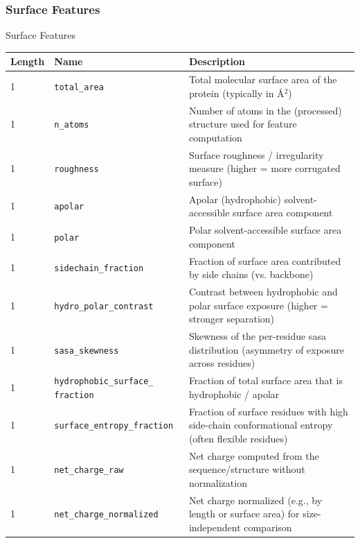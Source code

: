 \subsubsection{Surface Features}
\begin{frame}[shrink=10]{Surface Features}

\begin{longtable}{|p{1.5cm}||p{5cm}|p{12.6cm}|}
\hline
Length & Name & Description \\[4pt]
\hline
\endhead

1 & \texttt{total\_area} & Total molecular surface area of the protein (typically in \AA$^2$) \\
\hline
1 & \texttt{n\_atoms} & Number of atoms in the (processed) structure used for feature computation \\
\hline
1 & \texttt{roughness} & Surface roughness / irregularity measure (higher = more corrugated surface) \\
\hline
1 & \texttt{apolar} & Apolar (hydrophobic) solvent-accessible surface area component \\
\hline
1 & \texttt{polar} & Polar solvent-accessible surface area component \\
\hline
1 & \texttt{sidechain\_fraction} & Fraction of surface area contributed by side chains (vs. backbone) \\
\hline
1 & \texttt{hydro\_polar\_contrast} & Contrast between hydrophobic and polar surface exposure (higher = stronger separation) \\
\hline
1 & \texttt{sasa\_skewness} & Skewness of the per-residue \gls{sasa} distribution (asymmetry of exposure across residues) \\
\hline
1 & \texttt{hydrophobic\_surface\_ fraction} & Fraction of total surface area that is hydrophobic / apolar \\
\hline
1 & \texttt{surface\_entropy\_fraction} & Fraction of surface residues with high side-chain conformational entropy (often flexible residues) \\
\hline
1 & \texttt{net\_charge\_raw} & Net charge computed from the sequence/structure without normalization \\
\hline
1 & \texttt{net\_charge\_normalized} & Net charge normalized (e.g., by length or surface area) for size-independent comparison \\
\hline
\end{longtable}
\end{frame}


